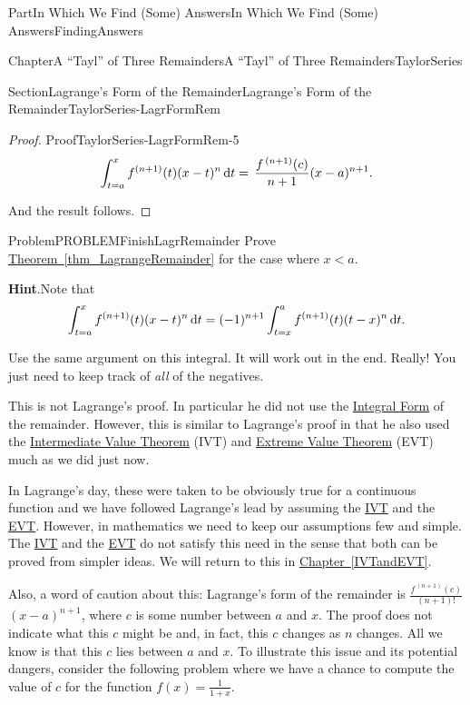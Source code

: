 \documentclass[oneside,10pt,]{book}
\newcommand{\blocktitlefont}{\relax}
\newcommand{\xreffont}{\relax}
\numberwithin{equation}{part}
\newcommand{\dx}[1]{\,{\rm d}#1}
\newcommand{\lt}{<}
\begin{document}
\begin{partptx}{Part}{In Which We Find (Some) Answers}{}{In Which We Find (Some) Answers}{}{}{FindingAnswers}
\begin{chapterptx}{Chapter}{A ``Tayl'' of Three Remainders}{}{A ``Tayl'' of Three Remainders}{}{}{TaylorSeries}
\begin{sectionptx}{Section}{Lagrange's Form of the Remainder}{}{Lagrange's Form of the Remainder}{}{}{TaylorSeries-LagrFormRem}
\begin{proof}{Proof}{}{TaylorSeries-LagrFormRem-5}
\begin{equation*}
\int_{t=a}^xf^{(n+1)}(t)(x-t)^n\dx{ t}=\,\frac{f^{\,(n+1)}(c)}{n+1}(x-a)^{n+1}\text{.}
\end{equation*}
%
\par
And the result follows.%
\end{proof}
\begin{problem}{Problem}{}{PROBLEMFinishLagrRemainder}%
Prove \hyperref[thm_LagrangeRemainder]{Theorem~{\xreffont\ref{thm_LagrangeRemainder}}} for the case where \(x\lt a\).%
\par\smallskip%
\noindent\textbf{\blocktitlefont Hint}.\hypertarget{PROBLEMFinishLagrRemainder-3}{}\quad{}Note that%
\begin{equation*}
\int_{t=a}^xf^{(n+1)}(t)(x-t)^n\dx{ t}=(-1)^{n+1}\int_{t=x}^af^{(n+1)}(t)(t-x)^n\dx{ t}\text{.}
\end{equation*}
%
\par
Use the same argument on this integral.  It will work out in the end.  Really!  You just need to keep track of \emph{all} of the negatives.%
\end{problem}
 This is not Lagrange's proof. In particular he did not use the \hyperref[EQUATIONIntFormRemainder]{Integral Form} of the remainder.  However, this is similar to Lagrange's proof in that he also used the \hyperref[IntermediateValueTheorem]{Intermediate Value Theorem} (IVT) and \hyperref[thm_EVT]{Extreme Value Theorem} (EVT) much as we did just now.%
\par
{} In Lagrange's day, these were taken to be obviously true for a continuous function and we have followed Lagrange's lead by assuming the \hyperref[IntermediateValueTheorem]{IVT} and the \hyperref[thm_EVT]{EVT}. However, in mathematics we need to keep our assumptions few and simple.  The \hyperref[IntermediateValueTheorem]{IVT} and the \hyperref[thm_EVT]{EVT} do not satisfy this need in the sense that both can be proved from simpler ideas. We will return to this in \hyperref[IVTandEVT]{Chapter~{\xreffont\ref{IVTandEVT}}}.%
\par
Also, a word of caution about this: Lagrange's form of the remainder is \(\frac{f^{\,(n+1)}(c)}{(n+1)!}\) \((x-a)^{n+1}\), where \(c\) is some number between \(a\) and \(x\).  The proof does not indicate what this \(c\) might be and, in fact, this \(c\) changes as \(n\) changes. All we know is that this \(c\) lies between \(a\) and \(x\).  To illustrate this issue and its potential dangers, consider the following problem where we have a chance to compute the value of \(c\) for the function \(f(x)=\frac{1}{1+x}\).%

\end{sectionptx}
\end{chapterptx}
\end{partptx}
\end{document}
